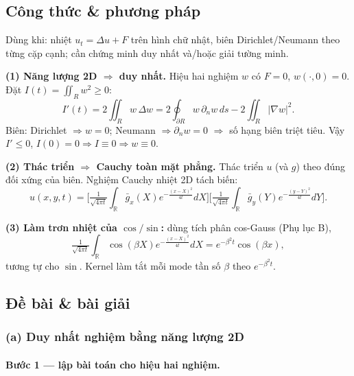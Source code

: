 \subsection*{Công thức \& phương pháp}

\begin{dieukienbox}
Dùng khi: nhiệt $u_t=\Delta u+F$ trên hình chữ nhật, biên Dirichlet/Neumann theo từng cặp cạnh; cần chứng minh duy nhất và/hoặc giải tường minh.
\end{dieukienbox}

\begin{nhobox}
\textbf{(1) Năng lượng 2D $\Rightarrow$ duy nhất.} Hiệu hai nghiệm $w$ có $F=0$, $w(\cdot,0)=0$. Đặt $I(t)=\iint_R w^2\ge0$:
\[
  I'(t)=2\!\iint_R w\,\Delta w
  =2\oint_{\partial R} w\,\partial_n w\,ds-2\!\iint_R|\nabla w|^2 .
\]
Biên: Dirichlet $\Rightarrow w=0$; Neumann $\Rightarrow \partial_n w=0$ $\Rightarrow$ số hạng biên triệt tiêu. Vậy $I'\le0$, $I(0)=0\Rightarrow I\equiv0\Rightarrow w\equiv0$.

\textbf{(2) Thác triển $\Rightarrow$ Cauchy toàn mặt phẳng.} Thác triển $u$ (và $g$) theo đúng đối xứng của biên. Nghiệm Cauchy nhiệt 2D tách biến:
\[
  u(x,y,t)=\Big[\tfrac{1}{\sqrt{4\pi t}}\!\int_{\mathbb R}\!\bar g_x(X)e^{-\frac{(x-X)^2}{4t}}dX\Big]
  \Big[\tfrac{1}{\sqrt{4\pi t}}\!\int_{\mathbb R}\!\bar g_y(Y)e^{-\frac{(y-Y)^2}{4t}}dY\Big].
\]

\textbf{(3) Làm trơn nhiệt của $\cos/\sin$:} dùng tích phân cos-Gauss (Phụ lục B),
\[
  \tfrac{1}{\sqrt{4\pi t}}\!\int_{\mathbb R}\!\cos(\beta X)e^{-\frac{(x-X)^2}{4t}}dX=e^{-\beta^2 t}\cos(\beta x),
\]
tương tự cho $\sin$. Kernel làm tắt mỗi mode tần số $\beta$ theo $e^{-\beta^2 t}$.
\end{nhobox}

\subsection*{Đề bài \& bài giải}

\subsubsection*{(a) Duy nhất nghiệm bằng năng lượng 2D}

\paragraph{Bước 1 --- lập bài toán cho hiệu hai nghiệm.}\leavevmode


